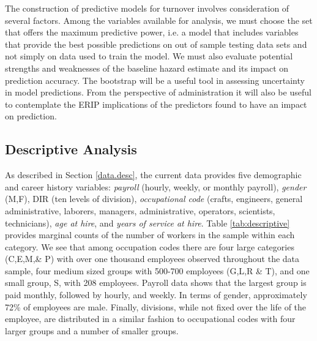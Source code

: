 \documentclass[12pt,letterpaper]{article}
\begin{document}
The construction of predictive models for turnover involves consideration of several factors. Among the variables available for analysis, we must choose the set that offers the maximum predictive power, i.e. a model that includes variables that provide the best possible predictions on out of sample testing data sets and not simply on data used to train the model. We must also evaluate potential strengths and weaknesses of the baseline hazard estimate and its impact on prediction accuracy.  The bootstrap will be a useful tool in assessing uncertainty in model predictions. From the perspective of administration it will also be useful to contemplate the ERIP implications of the predictors found to have an impact on prediction.

\subsection{Descriptive Analysis}

As described in Section \ref{data.desc}, the current data provides five demographic and career history variables: {\it payroll} (hourly, weekly, or monthly payroll), {\it gender} (M,F), DIR (ten levels of division), {\it occupational code} (crafts, engineers, general administrative, laborers, managers, administrative, operators, scientists, technicians), {\it age at hire}, and {\it years of service at hire}. Table \ref{tab:descriptive} provides marginal counts of the number of workers in the sample within each category.  We see that among occupation codes there are four large categories (C,E,M,\& P)  with over one thousand employees observed throughout the data sample, four medium sized groups with 500-700 employees (G,L,R \& T), and one small group, S, with 208 employees.  Payroll data shows that the largest group is paid monthly, followed by hourly, and weekly.  In terms of gender, approximately 72\% of employees are male. Finally, divisions, while not fixed over the life of the employee, are distributed in a similar fashion to occupational codes with four larger groups and a number of smaller groups.
\end{document}
